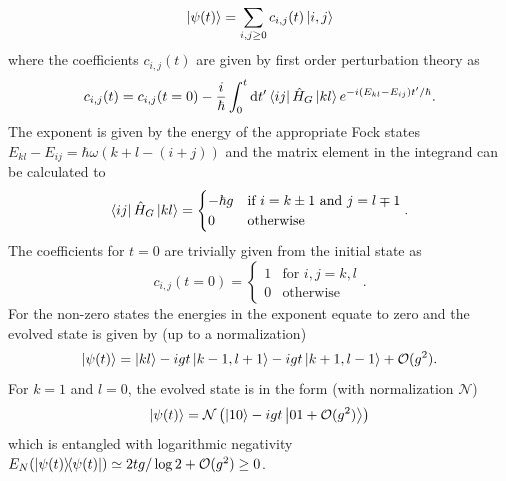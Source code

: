 \begin{equation}
  \ket{\psi(t)} = \sum_{i, j \geq 0} c_{i,j}(t) \ket{i,j}
\end{equation}
where the coefficients $c_{i,j}(t)$ are given by first order perturbation theory as
\begin{equation}
  c_{i,j}(t) = c_{i,j}(t = 0) - \frac{i}{\hbar} \int_0^t \dd t' \bra{ij}\hat{H}_G\ket{kl} e^{-i(E_{kl}-E_{ij})t'/\hbar} .
\end{equation}
The exponent is given by the energy of the appropriate Fock states $E_{kl}-E_{ij} = \hbar \omega (k+l - (i+j))$ and the matrix element in the integrand can be calculated to
\begin{equation}
  \bra{ij}\hat{H}_G\ket{kl} =
  \begin{cases}
    -\hbar g & \text{if } i = k \pm 1 \text{ and } j = l \mp 1 \\
    0 & \text{otherwise}
  \end{cases}.
\end{equation}
The coefficients for $t=0$ are trivially given from the initial state as
\begin{equation}
  c_{i,j}(t=0) = \begin{cases}
    1 & \text{for } i,j = k,l \\
    0 & \text{otherwise}
  \end{cases}.
\end{equation}
For the non-zero states the energies in the exponent equate to zero and the evolved state is given by (up to a normalization)
\begin{equation}\label{eq:apx:perturbation-result}
  \ket{\psi(t)} = \ket{kl} - i g t \ket{k-1,l+1} - i g t \ket{k+1,l-1} + \mathcal{O}(g^2).
\end{equation}
For $k=1$ and $l=0$, the evolved state is in the form (with normalization $\mathcal{N}$)
\begin{equation}
  \ket{\psi(t)} = \mathcal{N} \left(\ket{10} - igt\ket{01 + \mathcal{O}(g^2)}\right)
\end{equation}
which is entangled with logarithmic negativity $E_N(\ketbra{\psi(t)}) \simeq 2tg/\log 2 + \mathcal{O}(g^2) \geq 0$.



